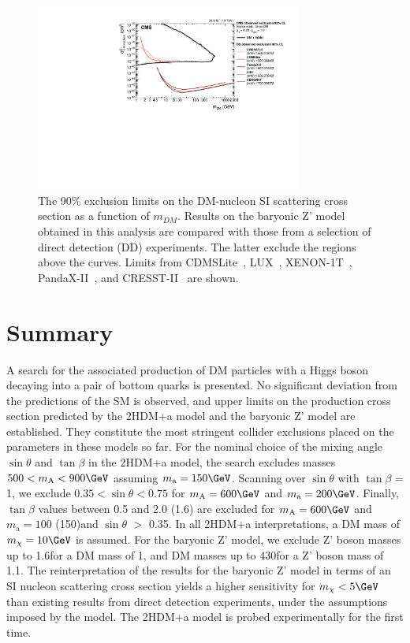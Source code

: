 \begin{figure}
  \centering
  \includegraphics[width=0.775\textwidth]{figures/limits/SpinIndepend_XsecDM_MonoHbb_bb_obs_Summary.pdf}
  \caption{The 90\% \CL exclusion limits on the DM-nucleon SI scattering cross section as a function of $m_{DM}$. 
Results on the baryonic Z' model obtained in this analysis are compared with those from a selection of direct detection (DD) experiments. 
The latter exclude the regions above the curves. 
Limits from CDMSLite~\cite{CDMSLite}, LUX~\cite{LUX}, XENON-1T~\cite{XENON1T}, PandaX-II~\cite{PandaxII}, and CRESST-II~\cite{CresstII} are shown.}
  \label{fig:limitsdd}
\end{figure}


\section{Summary}

A search for the associated production of DM particles with a Higgs
boson decaying into a pair of bottom quarks is presented. No significant
deviation from the predictions of the SM is observed, and upper limits on
the production cross section predicted by the 2HDM+a model and the
baryonic Z' model are established. They constitute the most stringent collider exclusions placed on the parameters in these
models so far. For the nominal choice of the mixing angle $\sin\theta$
and $\tan\beta$ in the 2HDM+a model, the search excludes masses
$500<m_\text{A}<900\GeV$ assuming $m_\text{a}=150\GeV$. Scanning over
$\sin\theta$ with $\tan\beta$ = 1, we exclude
$0.35<\sin\theta<0.75$ for $m_\text{A}=600\GeV$ and
$m_\text{a}=200\GeV$.  Finally, $\tan\beta$ values between 0.5 and 2.0
(1.6) are excluded for $m_\text{A}=600\GeV$ and $m_\text{a}=100$
(150)\GeV and $\sin\theta$ $>$ 0.35. In all 2HDM+a interpretations, a DM mass of $m_\chi=10\GeV$ is assumed. For the baryonic Z' model, we exclude Z' boson masses up to 1.6\TeV for a DM mass of 1\GeV, and DM masses up to 430\GeV for a Z' boson mass of 1.1\TeV. The reinterpretation of the results for the baryonic Z' model in terms of an SI nucleon scattering cross section yields a higher sensitivity for $m_\chi<5\GeV$ than existing results from direct detection experiments, under the assumptions imposed by the model. The 2HDM+a model is probed experimentally for the first time.

 
